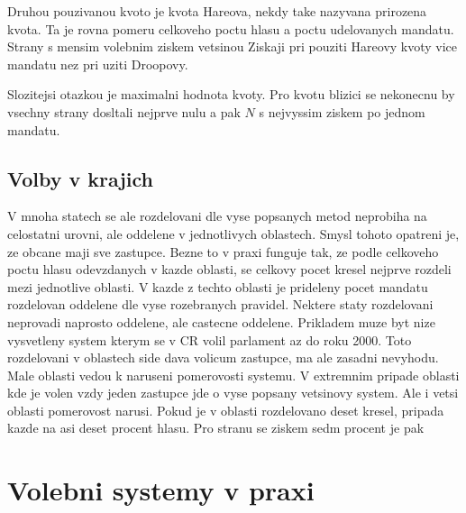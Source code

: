 \documentclass[12pt,a4paper]{report}
\begin{document}
Druhou pouzivanou kvoto je kvota Hareova, nekdy take nazyvana prirozena kvota. Ta je rovna pomeru celkoveho poctu hlasu a poctu udelovanych mandatu.
Strany s mensim volebnim ziskem vetsinou Ziskaji pri pouziti Hareovy kvoty vice mandatu nez pri uziti Droopovy.  

Slozitejsi otazkou je maximalni hodnota kvoty.
Pro kvotu blizici se nekonecnu by vsechny strany dosltali nejprve nulu a pak $N$ s nejvyssim ziskem po jednom mandatu.


\section{Volby v krajich}
V mnoha statech se ale rozdelovani dle vyse popsanych metod neprobiha na celostatni urovni, ale oddelene v jednotlivych oblastech.
Smysl tohoto opatreni je, ze obcane maji sve  zastupce.
Bezne to v praxi funguje tak, ze podle celkoveho poctu hlasu odevzdanych v kazde oblasti, se celkovy pocet kresel nejprve rozdeli mezi jednotlive oblasti.
V kazde z techto oblasti je prideleny pocet mandatu rozdelovan oddelene dle vyse rozebranych pravidel.
Nektere staty rozdelovani neprovadi naprosto oddelene, ale castecne oddelene.
Prikladem muze byt nize vysvetleny system kterym se v CR volil parlament az do roku 2000. %
Toto rozdelovani v oblastech side dava volicum  zastupce, ma ale zasadni nevyhodu.
Male oblasti vedou k naruseni pomerovosti systemu.
V extremnim pripade oblasti kde je volen vzdy jeden zastupce jde o vyse popsany vetsinovy system. 
Ale i vetsi oblasti pomerovost narusi.
Pokud je v oblasti rozdelovano deset kresel, pripada kazde na asi deset procent hlasu.
Pro stranu se ziskem sedm procent je pak

\chapter{Volebni systemy v praxi}
\end{document}
